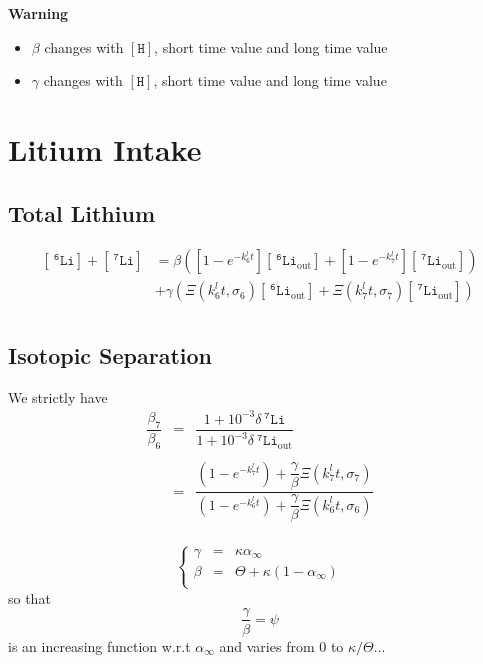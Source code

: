 \documentclass[aps,onecolumn,12pt]{revtex4}
\newcommand{\mychem}[1]{\mathtt{#1}}
\newcommand{\myconc}[1]{\left\lbrack{#1}\right\rbrack}
\newcommand{\spLi}[1]{{~^{\mychem{#1}}\mychem{Li}}}
\newcommand{\Li}[1]{\myconc{\spLi{#1}}}
\newcommand{\spLiOut}[1]{{\spLi{#1}}_{\mathrm{out}}}
\newcommand{\LiOut}[1]{\myconc{\spLiOut{#1}}}
\newcommand{\spproton}{\mychem{H}}
\newcommand{\proton}{\myconc{\spproton}}
\newcommand{\deltaLi}{ {\delta\!\!\!\spLi{7}} }
\newcommand{\deltaLiOut}{{\deltaLi}_{\mathrm{out}}}
\begin{document}

\centerline{\bf Warning}
\begin{itemize}
	\item $\beta$ changes with $\proton$, short time value and long time value
	\item $\gamma$ changes with $\proton$, short time value and long time value
\end{itemize}

\section{Litium Intake}
\subsection{Total Lithium}
	
\begin{equation}
\begin{array}{rl}
	\Li{6} + \Li{7} & = \beta \left( \left[1-e^{-k_6^l t}  \right] \LiOut{6} + \left[1-e^{-k_7^l t}  \right] \LiOut{7} \right)\\
	 & + \gamma\left(\Xi\left(k_6^lt,\sigma_6\right) \LiOut{6} +  \Xi\left(k_7^lt,\sigma_7\right) \LiOut{7} \right)\\
\end{array}
\end{equation}
	
\subsection{Isotopic Separation}
We strictly have
\begin{equation}
\begin{array}{rcl}
	\dfrac{\beta_7}{\beta_6} & = & \dfrac{1+10^{-3}\deltaLi}{1+10^{-3}\deltaLiOut}\\
	\\
	& = & \dfrac{\left(1-e^{-k_7^lt}\right)+\dfrac{\gamma}{\beta}\Xi\left(k_7^lt,\sigma_7\right)}
	{\left(1-e^{-k_6^lt}\right)+\dfrac{\gamma}{\beta}\Xi\left(k_6^lt,\sigma_6\right)}\\
\end{array}
\end{equation}

\begin{equation}
\left\lbrace
	\begin{array}{rcl}
	\gamma & = & \kappa \alpha_\infty \\
	\beta  & = & \Theta + \kappa (1-\alpha_\infty)\\
	\end{array}	
\right.
\end{equation}
so that 
\begin{equation}
	\dfrac{\gamma}{\beta} = \psi
\end{equation}
is an increasing function w.r.t $\alpha_\infty$ and varies from $0$ to $\kappa/\Theta$...
\end{document}
